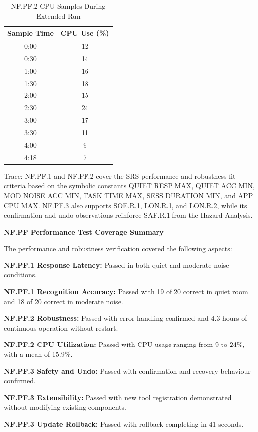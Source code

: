 \documentclass[12pt]{article}
\begin{document}
\begin{table}[htbp]
\centering
\caption{NF.PF.2 CPU Samples During Extended Run}
\label{tab:pf2-cpu}
\begin{tabular}{cc}
\toprule
\textbf{Sample Time} & \textbf{CPU Use (\%)}\\
\midrule
0:00 & 12\\
0:30 & 14\\
1:00 & 16\\
1:30 & 18\\
2:00 & 15\\
2:30 & 24\\
3:00 & 17\\
3:30 & 11\\
4:00 & 9\\
4:18 & 7\\
\bottomrule
\end{tabular}
\end{table}

\noindent Trace: NF.PF.1 and NF.PF.2 cover the SRS performance and
robustness fit criteria based on the symbolic constants QUIET RESP MAX,
QUIET ACC MIN, MOD NOISE ACC MIN, TASK TIME MAX, SESS DURATION MIN,
and APP CPU MAX. NF.PF.3 also supports SOE.R.1, LON.R.1, and LON.R.2,
while its confirmation and undo observations reinforce SAF.R.1 from the
Hazard Analysis.

\noindent\textbf{NF.PF Performance Test Coverage Summary}

The performance and robustness verification covered the following aspects:

\noindent\textbf{NF.PF.1 Response Latency:} Passed in both quiet and
moderate noise conditions.

\noindent\textbf{NF.PF.1 Recognition Accuracy:} Passed with 19 of 20
correct in quiet room and 18 of 20 correct in moderate noise.

\noindent\textbf{NF.PF.2 Robustness:} Passed with error handling
confirmed and 4.3 hours of continuous operation without restart.

\noindent\textbf{NF.PF.2 CPU Utilization:} Passed with CPU usage
ranging from 9 to 24\%, with a mean of 15.9\%.

\noindent\textbf{NF.PF.3 Safety and Undo:} Passed with confirmation
and recovery behaviour confirmed.

\noindent\textbf{NF.PF.3 Extensibility:} Passed with new tool
registration demonstrated without modifying existing components.

\noindent\textbf{NF.PF.3 Update Rollback:} Passed with rollback
completing in 41 seconds.
\end{document}
